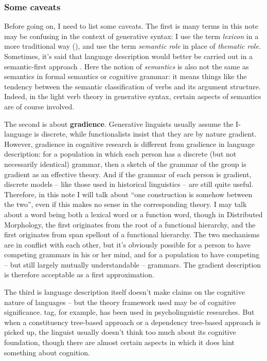 \documentclass[UTF8, a4paper, oneside, scheme=plain]{ctexart}
\newcommand*{\concept}[1]{\textbf{#1}}
\newcommand*{\term}[1]{\emph{#1}}
\begin{document}
\subsubsection{Some caveats}\label{sec:caveats}

Before going on, I need to list some caveats.
The first is many terms in this note may be confusing in the context of generative syntax:
I use the term \term{lexicon} in a more traditional way (),
and use the term \term{semantic role} in place of \term{thematic role}.
Sometimes, it's said that language description would better be carried out in a semantic-first approach
\citep{dixon2005semantic}.
Here the notion of \term{semantics} is also not the same as 
semantics in formal semantics or cognitive grammar:
it means things like the tendency between the semantic classification of verbs and its argument structure.
Indeed, in the light verb theory in generative syntax,
certain aspects of semantics are of course involved.

The second is about \concept{gradience}.
Generative linguists usually assume the I-language is discrete,
while functionalists insist that they are by nature gradient.
However, gradience in cognitive research is different from gradience in language description:
for a population in which each person has a discrete (but not necessarily identical) grammar,
then a sketch of the grammar of the group is gradient as an effective theory.
And if the grammar of each person is gradient,
discrete models -- like those used in historical linguistics --
are still quite useful.
Therefore, in this note I will talk about ``one construction is somehow between the two'',
even if this makes no sense in the corresponding theory.
I may talk about a word being both a lexical word or a function word,
though in Distributed Morphology,
the first originates from the root of a functional hierarchy,
and the first originates from span spellout of a functional hierarchy.
The two mechanisms are in conflict with each other,
but it's obviously possible for a person to have competing grammars in 
his or her mind,
and for a population to have competing -- but still largely mutually understandable -- grammars.
The gradient description is therefore acceptable as a first approximation.

The third is language description itself doesn't make claims on the cognitive nature of languages
-- but the theory framework used may be of cognitive significance.
\ac{tag}, for example, has been used in psycholinguistic researches.
But when a constituency tree-based approach or a dependency tree-based approach 
is picked up,
the linguist usually doesn't think too much about its cognitive foundation,
though there are almost certain aspects in which it does hint something about cognition.
\end{document}
